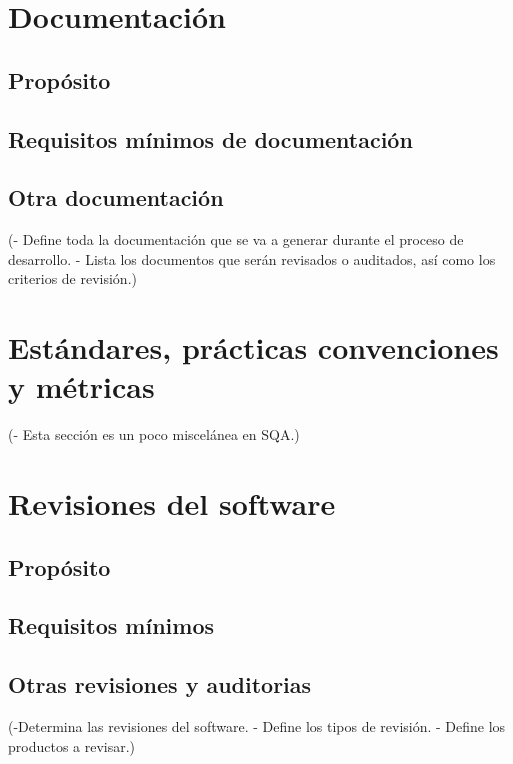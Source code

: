 \documentclass[spanish,a4paper,11pt, twoside]{report}	%
\begin{document}
\chapter{ Documentación}
	\section{Propósito}
	\section{Requisitos mínimos de documentación}
	\section{Otra documentación}

	(- Define toda la documentación que se va a generar
	durante el proceso de desarrollo.
	- Lista los documentos que serán revisados o
	auditados, así como los criterios de revisión.)

\newpage
\mbox{}
\thispagestyle{empty}						%
\newpage

\chapter{ Estándares, prácticas convenciones y métricas}
	(- Esta sección es un poco miscelánea en SQA.) %

\newpage
\mbox{}
\thispagestyle{empty}						%
\newpage

\chapter{ Revisiones del software}
	\section{Propósito}
	\section{Requisitos mínimos}
	\section{Otras revisiones y auditorias}

	(-Determina las revisiones del software.
	- Define los tipos de revisión.
	- Define los productos a revisar.)
\end{document}
